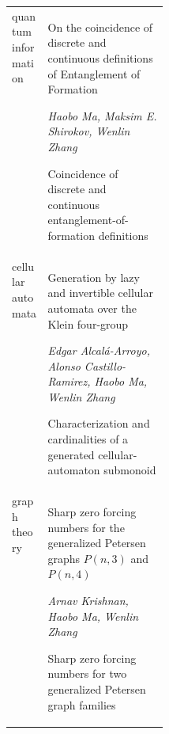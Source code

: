\begin{table}[htbp]
\begin{tabularx}{\linewidth}{@{}L{0.23\linewidth}Y@{}}
\par quantum information & On the coincidence of discrete and continuous definitions of Entanglement of Formation\par\emph{Haobo Ma, Maksim E. Shirokov, Wenlin Zhang}\par\smallskip Coincidence of discrete and continuous entanglement-of-formation definitions \\[8pt]
\par cellular automata & Generation by lazy and invertible cellular automata over the Klein four-group\par\emph{Edgar Alcal\'{a}-Arroyo, Alonso Castillo-Ramirez, Haobo Ma, Wenlin Zhang}\par\smallskip Characterization and cardinalities of a generated cellular-automaton submonoid \\[8pt]
\par graph theory & Sharp zero forcing numbers for the generalized Petersen graphs $P(n,3)$ and $P(n,4)$\par\emph{Arnav Krishnan, Haobo Ma, Wenlin Zhang}\par\smallskip Sharp zero forcing numbers for two generalized Petersen graph families \\[8pt]
\bottomrule\end{tabularx}\end{table}
